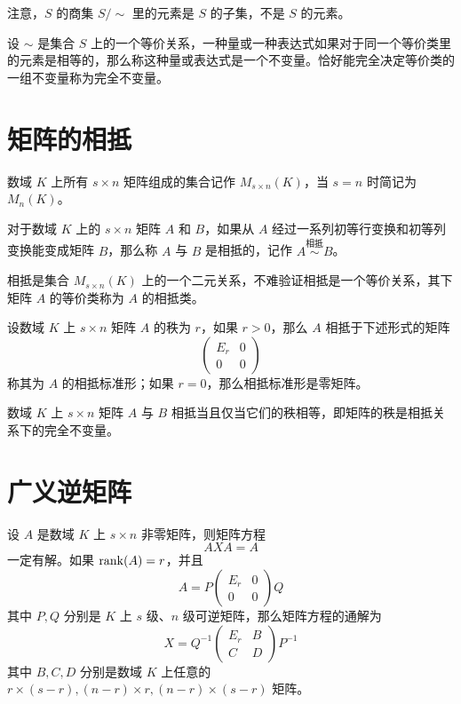注意，$S$ 的商集 $S/\sim$ 里的元素是 $S$ 的子集，不是 $S$ 的元素。

设 $\sim$ 是集合 $S$ 上的一个等价关系，一种量或一种表达式如果对于同一个等价类里的元素是相等的，那么称这种量或表达式是一个不变量。恰好能完全决定等价类的一组不变量称为完全不变量。

\section{矩阵的相抵}

数域 $K$ 上所有 $s\times n$ 矩阵组成的集合记作 $M_{s\times n}(K)$，当 $s=n$ 时简记为 $M_n(K)$。

\begin{definition}
    对于数域 $K$ 上的 $s\times n$ 矩阵 $A$ 和 $B$，如果从 $A$ 经过一系列初等行变换和初等列变换能变成矩阵 $B$，那么称 $A$ 与 $B$ 是相抵的，记作 $A\overset{\text{相抵}}{\sim}B$。
\end{definition}

相抵是集合 $M_{s\times n}(K)$ 上的一个二元关系，不难验证相抵是一个等价关系，其下矩阵 $A$ 的等价类称为 $A$ 的相抵类。

\begin{theorem}
    设数域 $K$ 上 $s\times n$ 矩阵 $A$ 的秩为 $r$，如果 $r>0$，那么 $A$ 相抵于下述形式的矩阵
    \[\left(\begin{matrix}
        E_r & 0\\
        0   & 0
    \end{matrix}\right)\]
    称其为 $A$ 的相抵标准形；如果 $r=0$，那么相抵标准形是零矩阵。
\end{theorem}

\begin{theorem}
    数域 $K$ 上 $s\times n$ 矩阵 $A$ 与 $B$ 相抵当且仅当它们的秩相等，即矩阵的秩是相抵关系下的完全不变量。
\end{theorem}

\section{广义逆矩阵}

\begin{theorem}
    设 $A$ 是数域 $K$ 上 $s\times n$ 非零矩阵，则矩阵方程
    \[AXA = A\]
    一定有解。如果 $\operatorname{rank}(A) = r$，并且
    \[A = P\left(\begin{matrix}
        E_r & 0\\
        0   & 0
    \end{matrix}\right)Q\]
    其中 $P,Q$ 分别是 $K$ 上 $s$ 级、$n$ 级可逆矩阵，那么矩阵方程的通解为
    \[X = Q^{-1}\left(\begin{matrix}
        E_r & B\\
        C   & D
    \end{matrix}\right)P^{-1}\]
    其中 $B,C,D$ 分别是数域 $K$ 上任意的 $r\times (s-r),(n-r)\times r,(n-r)\times (s-r)$ 矩阵。
\end{theorem}

